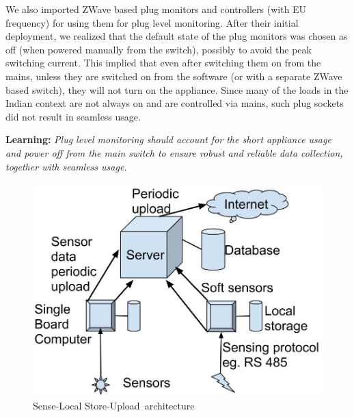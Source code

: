 \documentclass[10pt]{sensys-proc}
\newcommand{\paradigms}{Sense-Local Store-Upload~}
\begin{document}
We also imported ZWave based plug monitors and controllers (with EU frequency) for using them for plug level monitoring. After their initial deployment, we realized that the default state of the plug monitors was chosen as off (when powered manually from the switch), possibly to avoid the peak switching current. This implied that even after switching them on from the mains, unless they are switched on from the software (or with a separate ZWave based switch), they will not turn on the appliance. Since many of the loads in the Indian context are not always on and are controlled via mains, such plug sockets did not result in seamless usage. 

\textbf{Learning:} \emph{Plug level monitoring should account for the short appliance usage and power off from the main switch to ensure robust and reliable data collection, together with seamless usage.}



\begin{figure}

\centering \includegraphics[scale=0.12]{./figures/architecture.jpg}
\vspace{-2mm}
\caption{\paradigms architecture}
\vspace{-2mm}
\label{fig:architecture}
\end{figure}

\vspace{-1mm}
\end{document}
